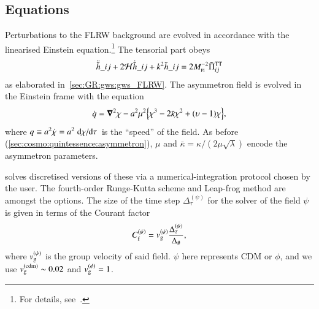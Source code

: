 \subsection{Equations}

    Perturbations to the FLRW background are evolved in accordance with the linearised Einstein equation.\footnote{For details, see~\citet{adamekGevolutionCosmologicalNbody2016}.} %
    The tensorial part obeys 
    \begin{equation}
        \ddot{\Ft{h}}\_{ij} + 2\mathcal{H} \dot{\Ft{h}}\_{ij} + k^2 \Ft{h}\_{ij} =  2M\nped{Pl}^{-2} \Ft{\Pi}\indices*{^{\mathrm{TT}}_{ij}}
    \end{equation}
    as elaborated in~\cref{sec:GR:gws:gws_FLRW}. %
    The asymmetron field is evolved in the Einstein frame with the equation
    \begin{equation}
        \dot{q} = \boldsymbol{\nabla}^2 \chi - a^2 \mu^2 {\left\{ \chi^3 - 2\bar{\kappa} \chi^2 + (\upsilon-1) \chi \right\}},
    \end{equation}
    where $q\equiv a^2 \dot{\chi}=a^2 \dv*{\chi}{\tau}$ is the ``speed'' of the field. As before (\cref{sec:cosmo:quintessence:asymmetron}), $\mu$ and $\bar{\kappa}=\kappa /(2\mu\sqrt{\lambda})$ encode the asymmetron parameters. 



    \asgrd{} solves discretised versions of these via a numerical-integration protocol chosen by the user. The fourth-order Runge-Kutta scheme and Leap-frog method are amongst the options. %
    The size of the time step $\Delta_\tau^{(\psi)}$ for the solver of the field $\psi$ is given in terms of the Courant factor~\citep{christiansenAsimulationDomainFormation2024}
    \begin{equation}
        C_\mathrm{f}^{(\psi)} = v_\mathrm{g}^{(\psi)} \frac{\Delta_\tau^{(\psi)}}{\Delta_\#},
    \end{equation}
    where $ v_\mathrm{g}^{(\psi)}$ is the group velocity of said field. $\psi$ here represents CDM or $\phi$, and we use $v_\mathrm{g}^\mathrm{(cdm)}\sim 0.02$ and $v_\mathrm{g}^{(\phi)}= 1$. %








